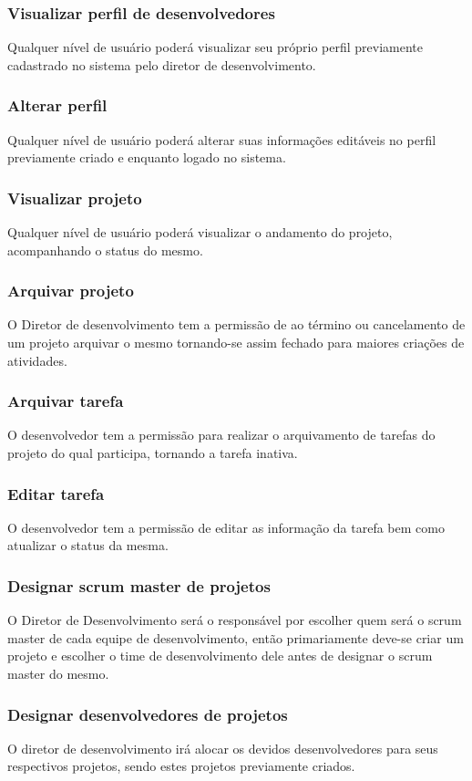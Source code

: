 \subsubsection{Visualizar perfil de desenvolvedores}
  Qualquer nível de usuário poderá visualizar seu próprio perfil previamente cadastrado no sistema pelo diretor de desenvolvimento.
\subsubsection{Alterar perfil}
  Qualquer nível de usuário poderá alterar suas informações editáveis no perfil previamente criado e enquanto logado no sistema.
\subsubsection{Visualizar projeto}
  Qualquer nível de usuário poderá visualizar o andamento do projeto, acompanhando o status do mesmo.
\subsubsection{Arquivar projeto}
  O Diretor de desenvolvimento tem a permissão de ao término ou cancelamento de um projeto arquivar o mesmo tornando-se assim fechado para maiores criações de atividades.
\subsubsection{Arquivar tarefa}
  O desenvolvedor tem a permissão para realizar o arquivamento de tarefas do projeto do qual participa, tornando a tarefa inativa.
\subsubsection{Editar tarefa}
  O desenvolvedor tem a permissão de editar as informação da tarefa bem como atualizar o status da mesma.
\subsubsection{Designar scrum master de projetos}
  O Diretor de Desenvolvimento será o responsável por escolher quem será o scrum master de cada equipe de desenvolvimento, então primariamente deve-se criar um projeto e escolher o time de desenvolvimento dele antes de designar o scrum master do mesmo.
\subsubsection{Designar desenvolvedores de projetos}
  O diretor de desenvolvimento irá alocar os devidos desenvolvedores para seus respectivos projetos, sendo estes projetos previamente criados.
